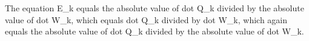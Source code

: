 The equation E_k equals the absolute value of dot Q_k divided by the absolute value of dot W_k, which equals dot Q_k divided by dot W_k, which again equals the absolute value of dot Q_k divided by the absolute value of dot W_k.